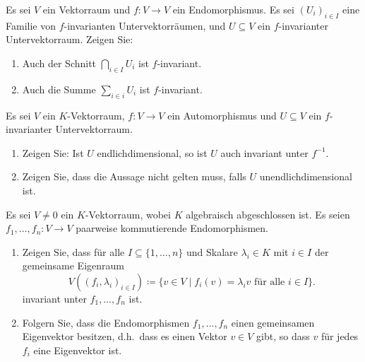 \documentclass[a4paper,10pt]{scrartcl}
\begin{document}
\begin{question}
  Es sei $V$ ein Vektorraum und $f \colon V \to V$ ein Endomorphismus.
  Es sei $(U_i)_{i \in I}$ eine Familie von $f$-invarianten Untervektorräumen, und $U \subseteq V$ ein $f$-invarianter Untervektorraum.
  Zeigen Sie:
  \begin{enumerate}[leftmargin=*]
    \item
      Auch der Schnitt $\bigcap_{i \in I} U_i$ ist $f$-invariant.
    \item
      Auch die Summe $\sum_{i \in i} U_i$ ist $f$-invariant.
  \end{enumerate}
\end{question}


\begin{question}
  Es sei $V$ ein $K$-Vektorraum, $f \colon V \to V$ ein Automorphismus und $U \subseteq V$ ein $f$-invarianter Untervektorraum.
  \begin{enumerate}[leftmargin=*]
    \item
      Zeigen Sie:
      Ist $U$ endlichdimensional, so ist $U$ auch invariant unter $f^{-1}$.
    \item
      Zeigen Sie, dass die Aussage nicht gelten muss, falls $U$ unendlichdimensional ist.
  \end{enumerate}
\end{question}










\begin{question}
  Es sei $V \neq 0$ ein $K$-Vektorraum, wobei $K$ algebraisch abgeschlossen ist.
  Es seien $f_1, \dotsc, f_n \colon V \to V$ paarweise kommutierende Endomorphismen.
  \begin{enumerate}
    \item
      Zeigen Sie, dass für alle $I \subseteq \{1, \dotsc, n\}$ und Skalare $\lambda_i \in K$ mit $i \in I$ der gemeinsame Eigenraum
      \[
                   V( (f_i, \lambda_i)_{i \in I} )
        \coloneqq  \{ v \in V \mid \text{$f_i(v) = \lambda_i v$ für alle $i \in I$} \}.
      \]
      invariant unter $f_1, \dotsc, f_n$ ist.
     \item
      Folgern Sie, dass die Endomorphismen $f_1, \dotsc, f_n$ einen gemeinsamen Eigenvektor besitzen, d.h.\ dass es einen Vektor $v \in V$ gibt, so dass $v$ für jedes $f_i$ eine Eigenvektor ist.
  \end{enumerate}
\end{question}
\end{document}
